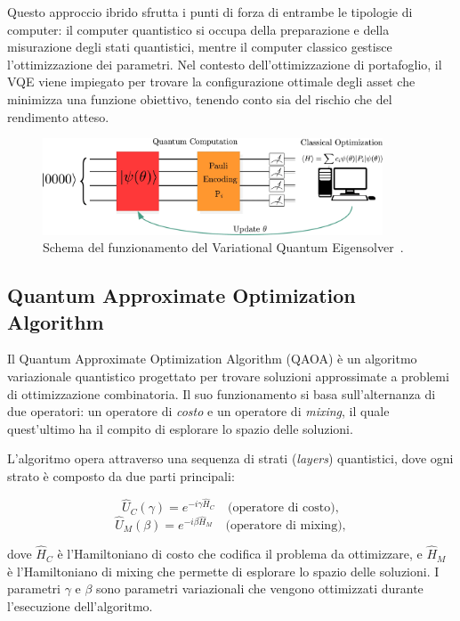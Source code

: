 Questo approccio ibrido sfrutta i punti di forza di entrambe le tipologie di 
computer: il computer quantistico si occupa della preparazione e della misurazione 
degli stati quantistici, mentre il computer classico gestisce l'ottimizzazione 
dei parametri. Nel contesto dell'ottimizzazione di portafoglio, il VQE viene 
impiegato per trovare la configurazione ottimale degli asset che minimizza una 
funzione obiettivo, tenendo conto sia del rischio che del rendimento atteso.

\begin{figure}[h!]
    \centering
    \includegraphics[width=0.9\textwidth]{images/vqe.png}
    \caption{Schema del funzionamento del Variational Quantum Eigensolver~\cite{buonaiuto2023best}.}
    \label{fig:circuitoVQE}
\end{figure}




\subsection{Quantum Approximate Optimization Algorithm}\label{sec:qaoa}
Il Quantum Approximate Optimization Algorithm (QAOA) è un algoritmo variazionale 
quantistico progettato per trovare soluzioni approssimate a problemi di 
ottimizzazione combinatoria. Il suo funzionamento si basa sull'alternanza di 
due operatori: un operatore di \textit{costo} e un operatore di \textit{mixing}, 
il quale quest'ultimo ha il compito di esplorare lo spazio delle soluzioni.

L'algoritmo opera attraverso una sequenza di strati (\textit{layers}) quantistici, 
dove ogni strato è composto da due parti principali:

\begin{equation}
   \hat{U}_C(\gamma) = e^{-i\gamma \hat{H}_C} \quad \text{(operatore di costo)},
\end{equation}
\begin{equation}    
   \hat{U}_M(\beta) = e^{-i\beta \hat{H}_M} \quad \text{(operatore di mixing)},
\end{equation}

dove $\hat{H}_C$ è l'Hamiltoniano di costo che codifica il problema da ottimizzare, 
e $\hat{H}_M$ è l'Hamiltoniano di mixing che permette di esplorare lo spazio delle 
soluzioni. I parametri $\gamma$ e $\beta$ sono parametri variazionali che vengono 
ottimizzati durante l'esecuzione dell'algoritmo.

